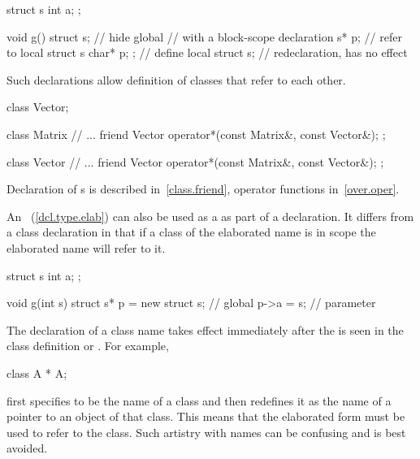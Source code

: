 \begin{codeblock}
struct s { int a; };

void g() {
  struct s;                     // hide global 
                                // with a block-scope declaration
  s* p;                         // refer to local 
  struct s { char* p; };        // define local 
  struct s;                     // redeclaration, has no effect
}
\end{codeblock}
\exitexample
\enternote
Such declarations allow definition of classes that refer to each other.
%
\enterexample

\begin{codeblock}
class Vector;

class Matrix {
  // ...
  friend Vector operator*(const Matrix&, const Vector&);
};

class Vector {
  // ...
  friend Vector operator*(const Matrix&, const Vector&);
};
\end{codeblock}

Declaration of s is described in~\ref{class.friend},
operator functions in~\ref{over.oper}.
\exitexample
\exitnote

\pnum
{}%
%
\enternote
An ~(\ref{dcl.type.elab}) can also
be used as a  as part of a declaration. It
differs from a class declaration in that if a class of the elaborated
name is in scope the elaborated name will refer to it.
\exitnote
\enterexample

\begin{codeblock}
struct s { int a; };

void g(int s) {
  struct s* p = new struct s;   // global 
  p->a = s;                     // parameter 
}
\end{codeblock}
\exitexample

\pnum
{}%
\enternote
The declaration of a class name takes effect immediately after the
 is seen in the class definition or
. For example,

\begin{codeblock}
class A * A;
\end{codeblock}

first specifies  to be the name of a class and then redefines
it as the name of a pointer to an object of that class. This means that
the elaborated form   must be used to refer to the
class. Such artistry with names can be confusing and is best avoided.
\exitnote

